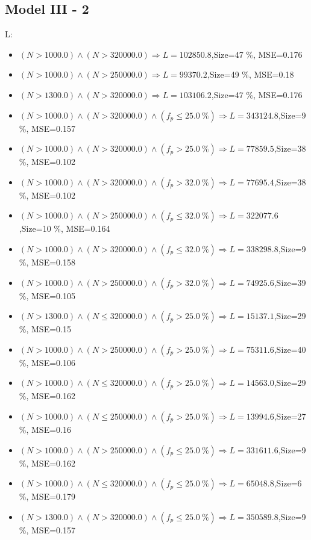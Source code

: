 \documentclass[numbered]{CSL}
\begin{document}
\subsection{Model III - 2}
L:
\begin{itemize}
\item $(N > 1000.0) \land (N > 320000.0) \Rightarrow L = 102850.8$,\hfill Size=47 \%, MSE=0.176
\item $(N > 1000.0) \land (N > 250000.0) \Rightarrow L = 99370.2$,\hfill Size=49 \%, MSE=0.18
\item $(N > 1300.0) \land (N > 320000.0) \Rightarrow L = 103106.2$,\hfill Size=47 \%, MSE=0.176
\item $(N > 1000.0) \land (N > 320000.0) \land (f_p \leq 25.0~\%) \Rightarrow L = 343124.8$,\hfill Size=9 \%, MSE=0.157
\item $(N > 1000.0) \land (N > 320000.0) \land (f_p > 25.0~\%) \Rightarrow L = 77859.5$,\hfill Size=38 \%, MSE=0.102
\item $(N > 1000.0) \land (N > 320000.0) \land (f_p > 32.0~\%) \Rightarrow L = 77695.4$,\hfill Size=38 \%, MSE=0.102
\item $(N > 1000.0) \land (N > 250000.0) \land (f_p \leq 32.0~\%) \Rightarrow L = 322077.6$,\hfill Size=10 \%, MSE=0.164
\item $(N > 1000.0) \land (N > 320000.0) \land (f_p \leq 32.0~\%) \Rightarrow L = 338298.8$,\hfill Size=9 \%, MSE=0.158
\item $(N > 1000.0) \land (N > 250000.0) \land (f_p > 32.0~\%) \Rightarrow L = 74925.6$,\hfill Size=39 \%, MSE=0.105
\item $(N > 1300.0) \land (N \leq 320000.0) \land (f_p > 25.0~\%) \Rightarrow L = 15137.1$,\hfill Size=29 \%, MSE=0.15
\item $(N > 1000.0) \land (N > 250000.0) \land (f_p > 25.0~\%) \Rightarrow L = 75311.6$,\hfill Size=40 \%, MSE=0.106
\item $(N > 1000.0) \land (N \leq 320000.0) \land (f_p > 25.0~\%) \Rightarrow L = 14563.0$,\hfill Size=29 \%, MSE=0.162
\item $(N > 1000.0) \land (N \leq 250000.0) \land (f_p > 25.0~\%) \Rightarrow L = 13994.6$,\hfill Size=27 \%, MSE=0.16
\item $(N > 1000.0) \land (N > 250000.0) \land (f_p \leq 25.0~\%) \Rightarrow L = 331611.6$,\hfill Size=9 \%, MSE=0.162
\item $(N > 1000.0) \land (N \leq 320000.0) \land (f_p \leq 25.0~\%) \Rightarrow L = 65048.8$,\hfill Size=6 \%, MSE=0.179
\item $(N > 1300.0) \land (N > 320000.0) \land (f_p \leq 25.0~\%) \Rightarrow L = 350589.8$,\hfill Size=9 \%, MSE=0.157

\end{itemize}
\end{document}
